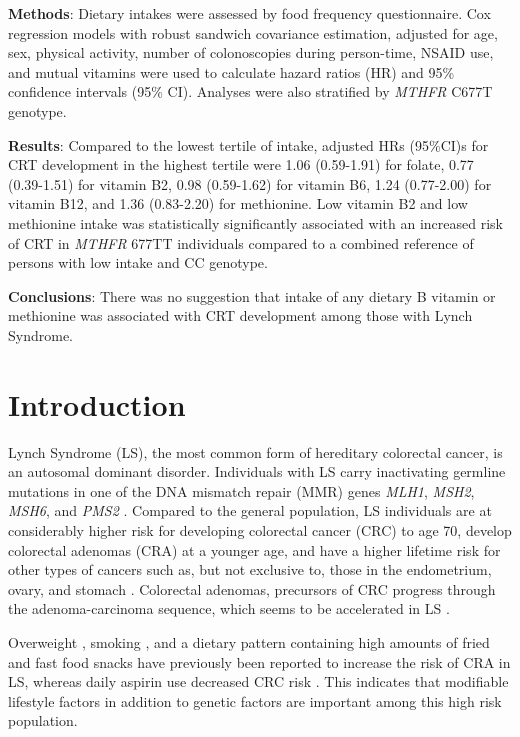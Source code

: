 \noindent \textbf{Methods}: Dietary intakes were assessed by food frequency questionnaire. Cox regression models with robust sandwich covariance estimation, adjusted for age, sex, physical activity, number of colonoscopies during person-time, NSAID use, and mutual vitamins were used to calculate hazard ratios (HR) and 95\% confidence intervals (95\% CI). Analyses were also stratified by \emph{MTHFR} C677T genotype.

\noindent \textbf{Results}: Compared to the lowest tertile of intake, adjusted HRs (95\%CI)s for CRT development in the highest tertile were 1.06 (0.59-1.91) for folate, 0.77 (0.39-1.51) for vitamin B2, 0.98 (0.59-1.62) for vitamin B6, 1.24 (0.77-2.00) for vitamin B12, and 1.36 (0.83-2.20) for methionine. Low vitamin B2 and low methionine intake was statistically significantly associated with an increased risk of CRT in \emph{MTHFR} 677TT individuals compared to a combined reference of persons with low intake and CC genotype.

\noindent \textbf{Conclusions}: There was no suggestion that intake of any dietary B vitamin or methionine was associated with CRT development among those with Lynch Syndrome.
 
\newpage
\section{Introduction} %
\noindent Lynch Syndrome (LS), the most common form of hereditary colorectal cancer, is an autosomal dominant disorder. Individuals with LS carry inactivating germline mutations in one of the DNA mismatch repair (MMR) genes \emph{MLH1}, \emph{MSH2}, \emph{MSH6}, and \emph{PMS2} \cite{c61,c62,c63,c64}. Compared to the general population, LS individuals are at considerably higher risk for developing colorectal cancer (CRC) to age 70, develop colorectal adenomas (CRA) at a younger age, and have a higher lifetime risk for other types of cancers such as, but not exclusive to, those in the endometrium, ovary, and stomach \cite{c65,c66,c67}. Colorectal adenomas, precursors of CRC \cite{c68,c69} progress through the adenoma-carcinoma sequence, which seems to be accelerated in LS \cite{c610,c611}.

\noindent Overweight \cite{c612}, smoking \cite{c613}, and a dietary pattern containing high amounts of fried and fast food snacks \cite{c614} have previously been reported to increase the risk of CRA in LS, whereas daily aspirin use decreased CRC risk \cite{c615}. This indicates that modifiable lifestyle factors in addition to genetic factors are important among this high risk population. 

